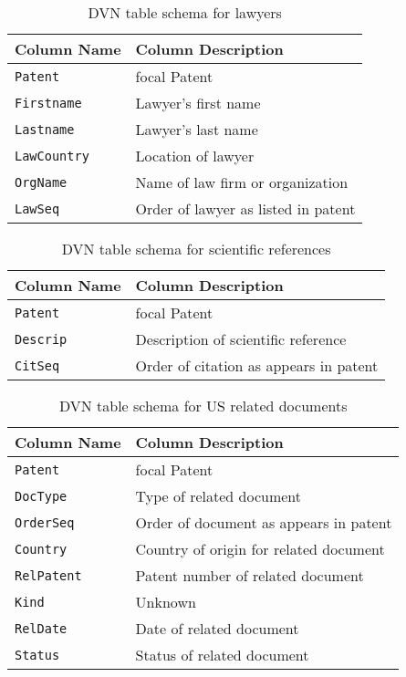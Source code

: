\begin{table*}
\center
\begin{tabular}{| l | l |}
\hline
Column Name & Column Description \\
\hline
\verb`Patent` & focal Patent \\
\verb`Firstname` & Lawyer's first name \\
\verb`Lastname` & Lawyer's last name \\
\verb`LawCountry` & Location of lawyer \\
\verb`OrgName` & Name of law firm or organization \\
\verb`LawSeq` & Order of lawyer as listed in patent \\
\hline
\end{tabular}
\caption{DVN table schema for lawyers}
\end{table*}

\begin{table*}
\center
\begin{tabular}{| l | l |}
\hline
Column Name & Column Description \\
\hline
\verb`Patent` & focal Patent \\
\verb`Descrip` & Description of scientific reference \\
\verb`CitSeq` & Order of citation as appears in patent \\
\hline
\end{tabular}
\caption{DVN table schema for scientific references}
\end{table*}

\begin{table*}
\center
\begin{tabular}{| l | l |}
\hline
Column Name & Column Description \\
\hline
\verb`Patent` & focal Patent \\
\verb`DocType` & Type of related document \\
\verb`OrderSeq` & Order of document as appears in patent \\
\verb`Country` & Country of origin for related document \\
\verb`RelPatent` & Patent number of related document \\
\verb`Kind` & Unknown \\
\verb`RelDate` & Date of related document \\
\verb`Status` & Status of related document \\
\hline
\end{tabular}
\caption{DVN table schema for US related documents}
\end{table*}